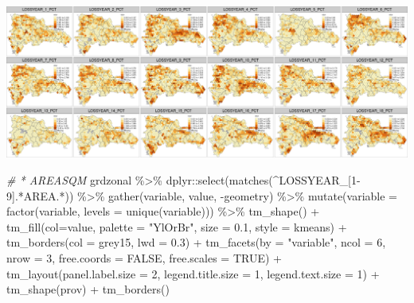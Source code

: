 \documentclass[10pt,landscape,a3paper]{article}
\newenvironment{Shaded}{\begin{snugshade}}{\end{snugshade}}
\newcommand{\AttributeTok}[1]{\textcolor[rgb]{0.77,0.63,0.00}{#1}}
\newcommand{\CommentTok}[1]{\textcolor[rgb]{0.56,0.35,0.01}{\textit{#1}}}
\newcommand{\ConstantTok}[1]{\textcolor[rgb]{0.00,0.00,0.00}{#1}}
\newcommand{\DecValTok}[1]{\textcolor[rgb]{0.00,0.00,0.81}{#1}}
\newcommand{\FloatTok}[1]{\textcolor[rgb]{0.00,0.00,0.81}{#1}}
\newcommand{\FunctionTok}[1]{\textcolor[rgb]{0.00,0.00,0.00}{#1}}
\newcommand{\NormalTok}[1]{#1}
\newcommand{\SpecialCharTok}[1]{\textcolor[rgb]{0.00,0.00,0.00}{#1}}
\newcommand{\StringTok}[1]{\textcolor[rgb]{0.31,0.60,0.02}{#1}}
\begin{document}
\begin{center}\includegraphics{img/data-download-preparation-eda/zonal-long-term-grid-3} \end{center}

\begin{Shaded}
\begin{Highlighting}[]
\CommentTok{\# * AREASQM}
\NormalTok{grdzonal }\SpecialCharTok{\%\textgreater{}\%}\NormalTok{ dplyr}\SpecialCharTok{::}\FunctionTok{select}\NormalTok{(}\FunctionTok{matches}\NormalTok{(}\StringTok{\textquotesingle{}\^{}LOSSYEAR\_[1{-}9].*AREA.*\textquotesingle{}}\NormalTok{)) }\SpecialCharTok{\%\textgreater{}\%}
  \FunctionTok{gather}\NormalTok{(variable, value, }\SpecialCharTok{{-}}\NormalTok{geometry) }\SpecialCharTok{\%\textgreater{}\%}
  \FunctionTok{mutate}\NormalTok{(}\AttributeTok{variable =} \FunctionTok{factor}\NormalTok{(variable, }\AttributeTok{levels =} \FunctionTok{unique}\NormalTok{(variable))) }\SpecialCharTok{\%\textgreater{}\%} 
  \FunctionTok{tm\_shape}\NormalTok{() }\SpecialCharTok{+}
  \FunctionTok{tm\_fill}\NormalTok{(}\AttributeTok{col=}\StringTok{\textquotesingle{}value\textquotesingle{}}\NormalTok{, }\AttributeTok{palette =} \StringTok{"YlOrBr"}\NormalTok{, }\AttributeTok{size =} \FloatTok{0.1}\NormalTok{, }\AttributeTok{style =} \StringTok{\textquotesingle{}kmeans\textquotesingle{}}\NormalTok{) }\SpecialCharTok{+}
  \FunctionTok{tm\_borders}\NormalTok{(}\AttributeTok{col =} \StringTok{\textquotesingle{}grey15\textquotesingle{}}\NormalTok{, }\AttributeTok{lwd =} \FloatTok{0.3}\NormalTok{) }\SpecialCharTok{+}
  \FunctionTok{tm\_facets}\NormalTok{(}\AttributeTok{by =} \StringTok{"variable"}\NormalTok{, }\AttributeTok{ncol =} \DecValTok{6}\NormalTok{, }\AttributeTok{nrow =} \DecValTok{3}\NormalTok{, }\AttributeTok{free.coords =} \ConstantTok{FALSE}\NormalTok{, }\AttributeTok{free.scales =} \ConstantTok{TRUE}\NormalTok{) }\SpecialCharTok{+}
  \FunctionTok{tm\_layout}\NormalTok{(}\AttributeTok{panel.label.size =} \DecValTok{2}\NormalTok{, }\AttributeTok{legend.title.size =} \DecValTok{1}\NormalTok{, }\AttributeTok{legend.text.size =} \DecValTok{1}\NormalTok{) }\SpecialCharTok{+}
  \FunctionTok{tm\_shape}\NormalTok{(prov) }\SpecialCharTok{+} \FunctionTok{tm\_borders}\NormalTok{()}
\end{Highlighting}
\end{Shaded}
\end{document}
